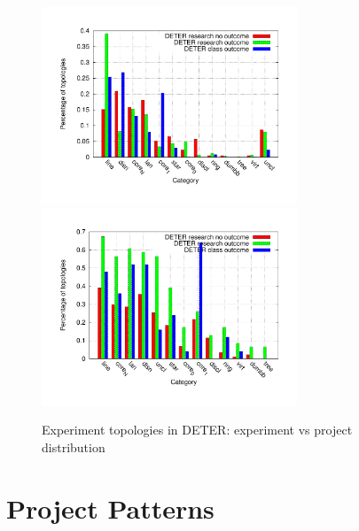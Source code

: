\documentclass[10pt, twocolumn]{article} %
\begin{document}
\begin{figure}[htbp] \begin{center} \includegraphics[width=3in,
type=pdf,ext=.pdf,read=.pdf]{figs/topo.gnu} \includegraphics[width=3in,
type=pdf,ext=.pdf,read=.pdf]{figs/topop.gnu} \caption{Experiment
topologies in DETER: experiment vs project distribution} \label{topo}
\end{center} \end{figure}




\section{Project Patterns}
\end{document}
